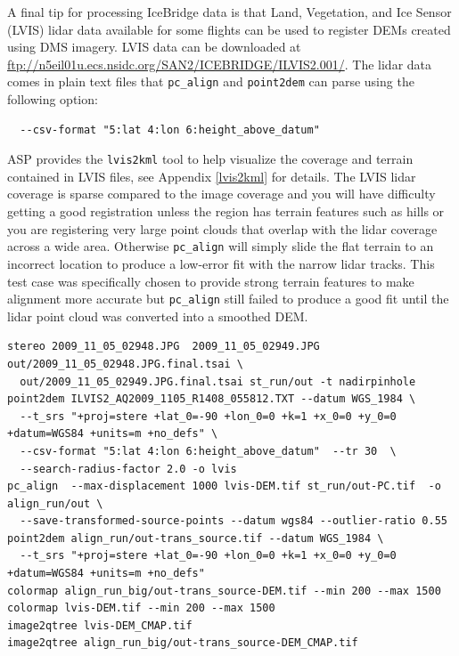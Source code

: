 A final tip for processing IceBridge data is that Land, Vegetation, and Ice Sensor (LVIS)
lidar data available for some flights can be used to register DEMs created using DMS
imagery.  LVIS data can be downloaded at
\url{ftp://n5eil01u.ecs.nsidc.org/SAN2/ICEBRIDGE/ILVIS2.001/}. The lidar data comes in plain text
files that \texttt{pc\_align} and \texttt{point2dem} can parse using the following option:
\begin{verbatim}  --csv-format "5:lat 4:lon 6:height_above_datum"  \end{verbatim}
ASP provides the \texttt{lvis2kml} tool to help visualize the coverage and terrain contained
in LVIS files, see Appendix \ref{lvis2kml} for details.
The LVIS lidar coverage is sparse compared to the image coverage and you will have difficulty
getting a good registration unless the region has terrain features such as hills or you are
registering very large point clouds that overlap with the lidar coverage across a wide area.
Otherwise \texttt{pc\_align} will simply slide the flat terrain to an incorrect location to
produce a low-error fit with the narrow lidar tracks.  This test case was specifically chosen
to provide strong terrain features to make alignment more accurate but \texttt{pc\_align} still
failed to produce a good fit until the lidar point cloud was converted into a smoothed DEM.

\begin{verbatim}
stereo 2009_11_05_02948.JPG  2009_11_05_02949.JPG  out/2009_11_05_02948.JPG.final.tsai \
  out/2009_11_05_02949.JPG.final.tsai st_run/out -t nadirpinhole
point2dem ILVIS2_AQ2009_1105_R1408_055812.TXT --datum WGS_1984 \
  --t_srs "+proj=stere +lat_0=-90 +lon_0=0 +k=1 +x_0=0 +y_0=0 +datum=WGS84 +units=m +no_defs" \
  --csv-format "5:lat 4:lon 6:height_above_datum"  --tr 30  \
  --search-radius-factor 2.0 -o lvis
pc_align  --max-displacement 1000 lvis-DEM.tif st_run/out-PC.tif  -o align_run/out \
  --save-transformed-source-points --datum wgs84 --outlier-ratio 0.55
point2dem align_run/out-trans_source.tif --datum WGS_1984 \
  --t_srs "+proj=stere +lat_0=-90 +lon_0=0 +k=1 +x_0=0 +y_0=0 +datum=WGS84 +units=m +no_defs"
colormap align_run_big/out-trans_source-DEM.tif --min 200 --max 1500
colormap lvis-DEM.tif --min 200 --max 1500
image2qtree lvis-DEM_CMAP.tif
image2qtree align_run_big/out-trans_source-DEM_CMAP.tif
\end{verbatim}

